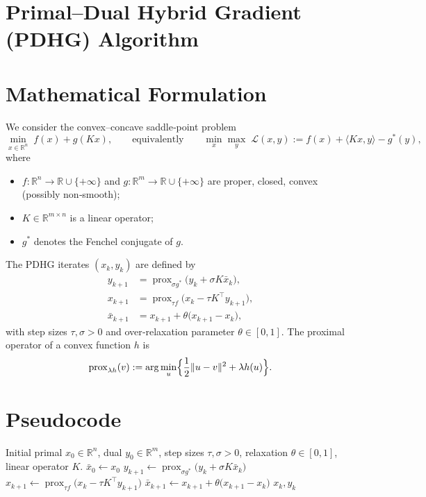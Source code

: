 \documentclass{article}
\newcommand{\prox}{\operatorname{prox}}
\newcommand{\ip}[2]{\langle #1,#2\rangle}
\begin{document}
\section*{Primal–Dual Hybrid Gradient (PDHG) Algorithm}

\section*{Mathematical Formulation}
We consider the convex–concave saddle‑point problem
\[
\min_{x\in\mathbb R^{n}} \; f(x)+g(Kx),
\qquad
\text{equivalently}\qquad
\min_{x}\max_{y}\; \mathcal L(x,y):=f(x)+\ip{Kx}{y}-g^{*}(y),
\]
where
\begin{itemize}
  \item $f:\mathbb R^{n}\to\mathbb R\cup\{+\infty\}$ and $g:\mathbb R^{m}\to\mathbb R\cup\{+\infty\}$ are proper, closed, convex (possibly non‑smooth);
  \item $K\in\mathbb R^{m\times n}$ is a linear operator;
  \item $g^{*}$ denotes the Fenchel conjugate of $g$.
\end{itemize}
The PDHG iterates $(x_k,y_k)$ are defined by
\begin{subequations}\label{eq:pdhg}
\begin{align}
y_{k+1}&=\prox_{\sigma g^{*}}\!\bigl(y_k+\sigma K\bar x_k\bigr),\tag{1a}\\[4pt]
x_{k+1}&=\prox_{\tau f}\!\bigl(x_k-\tau K^{\!\top} y_{k+1}\bigr),\tag{1b}\\[4pt]
\bar x_{k+1}&=x_{k+1}+\theta\bigl(x_{k+1}-x_k\bigr),\tag{1c}
\end{align}
\end{subequations}
with step sizes $\tau,\sigma>0$ and over‑relaxation parameter $\theta\in[0,1]$.  
The proximal operator of a convex function $h$ is
\[
\prox_{\lambda h}(v):=\arg\min_{u}\Bigl\{\frac12\|u-v\|^{2}+\lambda h(u)\Bigr\}.
\]

\section*{Pseudocode}
\begin{algorithm}[H]
\caption{Primal–Dual Hybrid Gradient (PDHG)}
\begin{algorithmic}[1]
\REQUIRE Initial primal $x_{0}\in\mathbb R^{n}$, dual $y_{0}\in\mathbb R^{m}$,
step sizes $\tau,\sigma>0$, relaxation $\theta\in[0,1]$,
linear operator $K$.
\STATE $\bar x_{0}\gets x_{0}$
    \STATE $y_{k+1}\gets \prox_{\sigma g^{*}}\!\bigl(y_{k}+\sigma K\bar x_{k}\bigr)$        
    \STATE $x_{k+1}\gets \prox_{\tau f}\!\bigl(x_{k}-\tau K^{\!\top} y_{k+1}\bigr)$      
    \STATE $\bar x_{k+1}\gets x_{k+1}+\theta\bigl(x_{k+1}-x_{k}\bigr)$                     
\ENDFOR
\RETURN $x_{k},y_{k}$
\end{algorithmic}
\end{algorithm}
\end{document}
